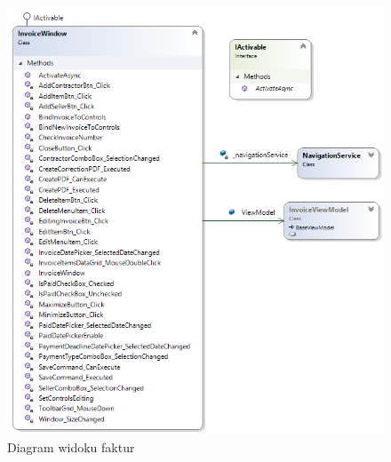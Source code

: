 \newpage
\begin{figure}[ht!]
\centering
  \includegraphics[width=0.7\linewidth]{Rysunki/InvoiceWindowDiagram.png}
  \caption{Diagram widoku faktur}
  \label{fig:InvoiceWindowDiagram}
\end{figure}

